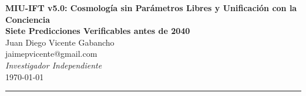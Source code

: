 \documentclass[12pt, a4paper]{article}
\theoremstyle{miuThm}
\theoremstyle{remark}
\begin{document}
\begin{center}
  \vspace*{0.3cm}
  {\LARGE\bfseries MIU-IFT v5.0: Cosmología sin Parámetros Libres y Unificación con la Conciencia\\[5pt]
   Siete Predicciones Verificables antes de 2040}\\[1.2em]
  {\large Juan Diego Vicente Gabancho}\\[0.3em]
  {\normalsize\ttfamily jaimepvicente@gmail.com}\\[0.15em]
  {\normalsize\itshape Investigador Independiente}\\[0.5em]
  {\normalsize\today}\\[0.5em]
  \noindent\rule{0.85\linewidth}{0.4pt}
\end{center}
\end{document}
